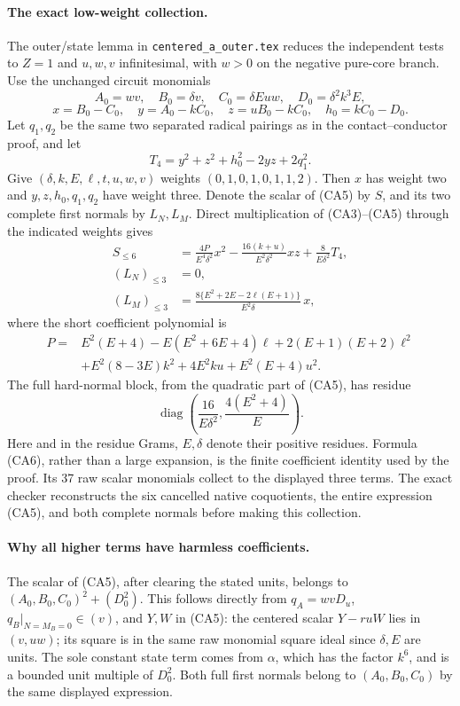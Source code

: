 \paragraph{The exact low-weight collection.}
The outer/state lemma in \texttt{centered\_a\_outer.tex} reduces the
independent tests to $Z=1$ and $u,w,v$ infinitesimal, with $w>0$ on
the negative pure-core branch. Use the unchanged circuit monomials
\[
 A_0=wv,\quad B_0=\delta v,\quad C_0=\delta Euw,
 \quad D_0=\delta^2k^3E,
\]
\[
 x=B_0-C_0,\quad y=A_0-kC_0,\quad
 z=uB_0-kC_0,\quad h_0=kC_0-D_0.
\]
Let $q_1,q_2$ be the same two separated radical pairings as in the
contact--conductor proof, and let
\[
 T_4=y^2+z^2+h_0^2-2yz+2q_1^2.
\]
Give $(\delta,k,E,\ell,t,u,w,v)$ weights $(0,1,0,1,0,1,1,2)$.
Then $x$ has weight two and $y,z,h_0,q_1,q_2$ have weight three.
Denote the scalar of (CA5) by $S$, and its two complete first normals
by $L_N,L_M$. Direct multiplication of (CA3)--(CA5) through the
indicated weights gives
\[
 \begin{aligned}
 S_{\le6}&=\frac{4P}{E^4\delta^2}x^2
 -\frac{16(k+u)}{E^2\delta^2}xz
 +\frac8{E\delta^2}T_4,\\
 (L_N)_{\le3}&=0,\\
 (L_M)_{\le3}&=
 \frac{8\{E^2+2E-2\ell(E+1)\}}{E^2\delta}\,x,
 \end{aligned}                                                   \tag{CA6}
\]
where the short coefficient polynomial is
\[
 \begin{split}
 P={}&E^2(E+4)-E(E^2+6E+4)\ell+2(E+1)(E+2)\ell^2\\
 &+E^2(8-3E)k^2+4E^2ku+E^2(E+4)u^2.
 \end{split}
\]
The full hard-normal block, from the quadratic part of (CA5), has
residue
\[
       \operatorname{diag}\left(\frac{16}{E\delta^2},
                                \frac{4(E^2+4)}E\right).          \tag{CA7}
\]
Here and in the residue Grams, $E,\delta$ denote their positive
residues. Formula (CA6), rather than a large expansion, is the finite
coefficient identity used by the proof. Its 37 raw scalar monomials
collect to the displayed three terms. The exact checker reconstructs
the six cancelled native coquotients, the entire expression (CA5),
and both complete normals before making this collection.

\paragraph{Why all higher terms have harmless coefficients.}
The scalar of (CA5), after clearing the stated units, belongs to
$(A_0,B_0,C_0)^2+(D_0^2)$. This follows directly from $q_A=wvD_u$,
$q_B|_{N=M_B=0}\in(v)$, and $Y,W$ in (CA5): the centered scalar
$Y-r uW$ lies in $(v,uw)$; its square is in the same raw monomial
square ideal since $\delta,E$ are units. The sole constant state term
comes from $\alpha$, which has the factor $k^6$, and is a bounded
unit multiple of $D_0^2$. Both full first normals belong to
$(A_0,B_0,C_0)$ by the same displayed expression.

